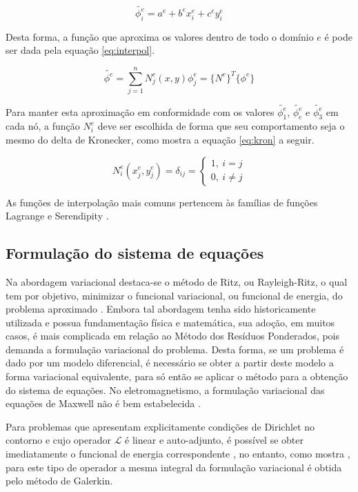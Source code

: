 \documentclass[
    12pt,               %
    openright,          %
    oneside,
    a4paper,            %
    english,            %
    french,             %
    spanish,            %
    brazil              %
    ]{abntex2}
\begin{document}
\begin{equation}
\label{eq:interp}
\tilde{\phi^e_i} = a^e + b^e x^e_i + c^e y^e_i
\end{equation}

Desta forma, a função que aproxima os valores dentro de todo o domínio $e$ é pode ser dada pela equação \ref{eq:interpol}.

\begin{equation}
\label{eq:interpol}
\tilde{\phi^e} = \sum_{j=1}^{n}{N_j^e (x, y) \phi_j^e} = 
\{N^e\}^T \{\phi^e\}
\end{equation}

Para manter esta aproximação em conformidade com os valores $\tilde{\phi^e_1}$, $\tilde{\phi^e_e}$ e $\tilde{\phi^e_3}$ em cada nó, a função $N_i^e$ deve ser escolhida de forma que seu comportamento seja o mesmo do delta de Kronecker, como mostra a equação \ref{eq:kron} a seguir.

\begin{equation}
\label{eq:kron}
N_i^e(x^e_j, y^e_j) = \delta_{ij} = \begin{cases}
1, \ i = j\\
0, \ i \neq j
\end{cases}
\end{equation}

As funções de interpolação mais comuns pertencem às famílias de funções Lagrange e Serendipity \cite{zien, volakis}.

\subsection{Formulação do sistema de equações}
Na abordagem variacional destaca-se o método de Ritz, ou Rayleigh-Ritz, o qual tem por objetivo, minimizar o funcional variacional, ou funcional de energia, do problema aproximado \cite{volakis}. Embora tal abordagem tenha sido historicamente utilizada e possua fundamentação física e matemática, sua adoção, em muitos casos, é mais complicada em relação ao Método dos Resíduos Ponderados, pois demanda a formulação variacional do problema. Desta forma, se um problema é dado por um modelo diferencial, é necessário se obter a partir deste modelo a forma variacional equivalente, para só então se aplicar o método para a obtenção do sistema de equações. No eletromagnetismo, a formulação variacional das equações de Maxwell não é bem estabelecida \cite{jin}.

Para problemas que apresentam explicitamente condições de Dirichlet no contorno e cujo operador $\mathcal{L}$ é linear e auto-adjunto, é possível se obter imediatamente o funcional de energia correspondente \cite{zien}, no entanto, como mostra \cite[p. 29]{volakis}, para este tipo de operador a mesma integral da formulação variacional é obtida pelo método de Galerkin.
\end{document}
